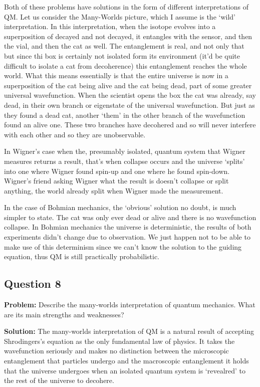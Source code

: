 \documentclass{article}
\begin{document}
Both of these problems have solutions in the form of different interpretations of QM. Let us consider the Many-Worlds picture, which I assume is the `wild' interpretation. In this interpretation, when the isotope evolves into a superposition of decayed and not decayed, it entangles with the sensor, and then the vial, and then the cat as well. The entanglement is real, and not only that but since thi box is certainly not isolated form its environment (it'd be quite difficult to isolate a cat from decoherence) this entanglement reaches the whole world. What this means essentially is that the entire universe is now in a superposition of the cat being alive and the cat being dead, part of some greater universal wavefunction. When the scientist opens the box the cat was already, say dead, in their own branch or eigenstate of the universal wavefunction. But just as they found a dead cat, another `them' in the other branch of the wavefunction found an alive one. These two branches have decohered and so will never interfere with each other and so they are unobservable.

In Wigner's case when the, presumably isolated, quantum system that Wigner measures returns a result, that's when collapse occurs and the universe `splits' into one where Wigner found spin-up and one where he found spin-down. Wigner's friend asking Wigner what the result is doesn't collapse or split anything, the world already split when Wigner made the measurement.
\bigskip

In the case of Bohmian mechanics, the `obvious' solution no doubt, is much simpler to state. The cat was only ever dead or alive and there is no wavefunction collapse. In Bohmian mechanics the universe is deterministic, the results of both experiments didn't change due to observation. We just happen not to be able to make use of this determinism since we can't know the solution to the guiding equation, thus QM is still practically probabilistic.

\subsection*{Question 8}
\noindent\textbf{Problem:} Describe the many-worlds interpretation of quantum mechanics. What are its main strengths and weaknesses?
\bigskip

\noindent\textbf{Solution:} The many-worlds interpretation of QM is a natural result of accepting Shrodingers's equation as the only fundamental law of physics. It takes the wavefunction seriously and makes no distinction between the microscopic entanglement that particles undergo and the macroscopic entanglement it holds that the universe undergoes when an isolated quantum system is `revealred' to the rest of the universe to decohere.
\end{document}

